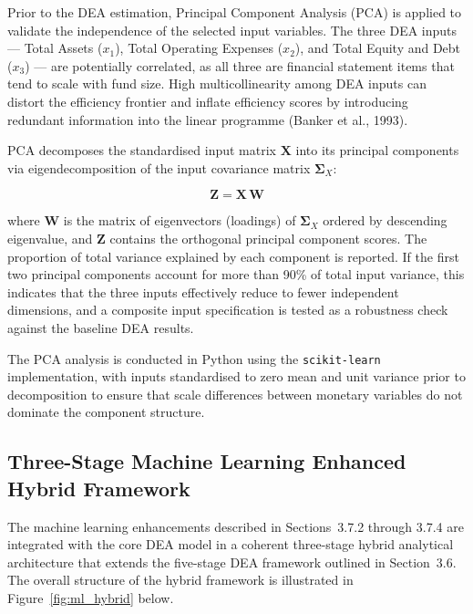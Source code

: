\documentclass[12pt,a4paper]{article}
\begin{document}
Prior to the DEA estimation, Principal Component Analysis (PCA) is applied to validate the independence of the selected input variables. The three DEA inputs --- Total Assets ($x_1$), Total Operating Expenses ($x_2$), and Total Equity and Debt ($x_3$) --- are potentially correlated, as all three are financial statement items that tend to scale with fund size. High multicollinearity among DEA inputs can distort the efficiency frontier and inflate efficiency scores by introducing redundant information into the linear programme (Banker et al., 1993).

PCA decomposes the standardised input matrix $\mathbf{X}$ into its principal components via eigendecomposition of the input covariance matrix $\boldsymbol{\Sigma}_X$:

\begin{equation}
    \mathbf{Z} = \mathbf{X}\,\mathbf{W}
\end{equation}

where $\mathbf{W}$ is the matrix of eigenvectors (loadings) of $\boldsymbol{\Sigma}_X$ ordered by descending eigenvalue, and $\mathbf{Z}$ contains the orthogonal principal component scores. The proportion of total variance explained by each component is reported. If the first two principal components account for more than 90\% of total input variance, this indicates that the three inputs effectively reduce to fewer independent dimensions, and a composite input specification is tested as a robustness check against the baseline DEA results.

The PCA analysis is conducted in Python using the \texttt{scikit-learn} implementation, with inputs standardised to zero mean and unit variance prior to decomposition to ensure that scale differences between monetary variables do not dominate the component structure.

\subsection{Three-Stage Machine Learning Enhanced Hybrid Framework}

The machine learning enhancements described in Sections~3.7.2 through 3.7.4 are integrated with the core DEA model in a coherent three-stage hybrid analytical architecture that extends the five-stage DEA framework outlined in Section~3.6. The overall structure of the hybrid framework is illustrated in Figure~\ref{fig:ml_hybrid} below.
\end{document}
